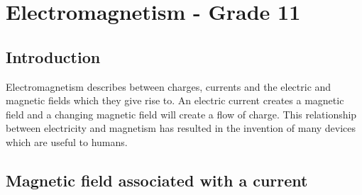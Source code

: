 



\chapter{Electromagnetism - Grade 11}
\label{p:em:em11}

\section{Introduction}

Electromagnetism describes between charges, currents and the electric and magnetic fields which they give rise to. An electric current creates a magnetic field and a changing magnetic field will create a flow of charge. This relationship between electricity and magnetism has resulted in the invention of many devices which are useful to humans.

\section{Magnetic field associated with a current}

